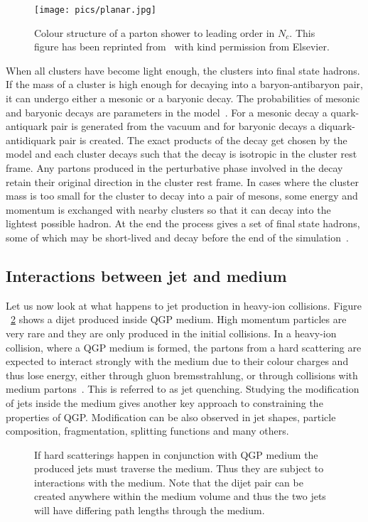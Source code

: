 \begin{figure}
\centering
\texttt{[image: pics/planar.jpg]}
\caption[]{ Colour structure of a parton shower to leading order in $N_c$. This figure has been reprinted from~\cite{eventGenerators} with kind permission from Elsevier.}
\label{fig:colourstructure}
\end{figure}

When all clusters have become light enough, the clusters into final state hadrons. If the mass of a cluster is high enough for decaying into a baryon-antibaryon pair, it can undergo either a mesonic or a baryonic decay. The probabilities of mesonic and baryonic decays are parameters in the model~\cite{herwigManual}. For a mesonic decay a quark-antiquark pair is generated from the vacuum and for baryonic decays a diquark-antidiquark pair is created. The exact products of the decay get chosen by the model and each cluster decays such that the decay is isotropic in the cluster rest frame. Any partons produced in the perturbative phase involved in the decay retain their original direction in the cluster rest frame. In cases where the cluster mass is too small for the cluster to decay into a pair of mesons, some energy and momentum is exchanged with nearby clusters so that it can decay into the lightest possible hadron. At the end the process gives a set of final state hadrons, some of which may be short-lived and decay before the end of the simulation~\cite{herwigManual}.

\subsection{Interactions between jet and medium}
Let us now look at what happens to jet production in heavy-ion collisions. Figure ~\ref{fig:jetq} shows a dijet produced inside QGP medium. High momentum particles are very rare and they are only produced in the initial collisions. In a heavy-ion collision, where a QGP medium is formed, the partons from a hard scattering are expected to interact strongly with the medium due to their colour charges and thus lose energy, either through gluon bremsstrahlung, or through collisions with medium partons~\cite{Connors:2017ptx}. This is referred to as jet quenching.  Studying the modification of jets inside the medium gives another key approach to constraining the properties of QGP. Modification can be also observed in jet shapes, particle composition, fragmentation, splitting functions and many others.


\begin{figure}
\centering

\caption{If hard scatterings happen in conjunction with QGP medium the produced jets must traverse the medium. Thus they are subject to interactions with the medium. Note that the dijet pair can be created anywhere within the medium volume and thus the two jets will have differing path lengths through the medium.}
\label{fig:jetq}
\end{figure}

